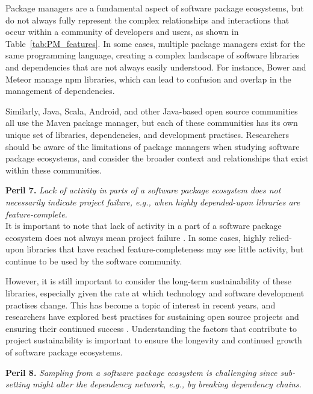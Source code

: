 Package managers are a fundamental aspect of software package ecosystems, but do not always fully represent the complex relationships and interactions that occur within a community of developers and users, as shown in Table~\ref{tab:PM_features}. In some cases, multiple package managers exist for the same programming language, creating a complex landscape of software libraries and dependencies that are not always easily understood. For instance, Bower and Meteor manage npm libraries, which can lead to confusion and overlap in the management of dependencies.

Similarly, Java, Scala, Android, and other Java-based open source communities all use the Maven package manager, but each of these communities has its own unique set of libraries, dependencies, and development practises. Researchers should be aware of the limitations of package managers when studying software package ecosystems, and consider the broader context and relationships that exist within these communities. 

\smallskip\noindent\textbf{Peril 7.}\textit{
Lack of activity in parts of a software package ecosystem does not necessarily indicate project failure, e.g., when highly depended-upon libraries are feature-complete.
}\\

It is important to note that lack of activity in a part of a software package ecosystem does not always mean project failure \cite{coelho2017modern}. In some cases, highly relied-upon libraries that have reached feature-completeness may see little activity, but continue to be used by the software community. 

However, it is still important to consider the long-term sustainability of these libraries, especially given the rate at which technology and software development practises change. This has become a topic of interest in recent years, and researchers have explored best practises for sustaining open source projects and ensuring their continued success \cite{Ait2022,valiev2018ecosystem}. Understanding the factors that contribute to project sustainability is important to ensure the longevity and continued growth of software package ecosystems.

\smallskip\noindent\textbf{Peril 8.}\textit{
Sampling from a software package ecosystem is challenging since sub-setting might alter the dependency network, e.g., by breaking dependency chains.
}\\


